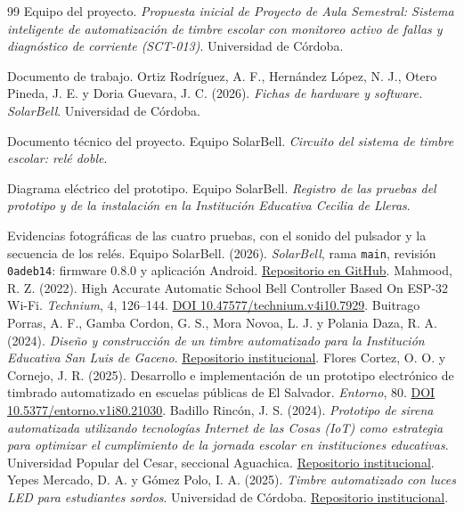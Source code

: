 \documentclass[a4paper,11pt]{article}
\newcommand{\senal}[1]{\texttt{#1}}
\newcommand{\bloquebiblio}[3]{\bibitem{#1} #2\par#3}
\begin{document}
\begin{thebibliography}{99}
\setlength{\itemsep}{3pt plus 0.5pt}
\bloquebiblio{propuesta}{Equipo del proyecto. \textit{Propuesta inicial de Proyecto de Aula Semestral: Sistema inteligente de automatización de timbre escolar con monitoreo activo de fallas y diagnóstico de corriente (SCT-013)}. Universidad de Córdoba.}{Documento de trabajo.}
\bloquebiblio{ficha}{Ortiz Rodríguez, A. F., Hernández López, N. J., Otero Pineda, J. E. y Doria Guevara, J. C. (2026). \textit{Fichas de hardware y software. SolarBell}. Universidad de Córdoba.}{Documento técnico del proyecto.}
\bloquebiblio{diagrama}{Equipo SolarBell. \textit{Circuito del sistema de timbre escolar: relé doble}.}{Diagrama eléctrico del prototipo.}
\bloquebiblio{evidencia}{Equipo SolarBell. \textit{Registro de las pruebas del prototipo y de la instalación en la Institución Educativa Cecilia de Lleras}.}{Evidencias fotográficas de las cuatro pruebas, con el sonido del pulsador y la secuencia de los relés.}
 Equipo SolarBell. (2026). \textit{SolarBell}, rama \senal{main}, revisión \senal{0adeb14}: firmware 0.8.0 y aplicación Android. \href{https://github.com/AndresOrtizJDK/SolarBell/tree/0adeb14514f4e0b15457052f21800002322fbb43}{Repositorio en GitHub}.
 Mahmood, R. Z. (2022). High Accurate Automatic School Bell Controller Based On ESP-32 Wi-Fi. \textit{Technium}, 4, 126--144. \href{https://doi.org/10.47577/technium.v4i10.7929}{DOI 10.47577/technium.v4i10.7929}.
 Buitrago Porras, A. F., Gamba Cordon, G. S., Mora Novoa, L. J. y Polania Daza, R. A. (2024). \textit{Diseño y construcción de un timbre automatizado para la Institución Educativa San Luis de Gaceno}. \href{https://repositorio.colegiosanluisgaceno.edu.co/proyecto-implementacion-de-una-pagina-web-corporativa-graficas-san-vicente/}{Repositorio institucional}.
 Flores Cortez, O. O. y Cornejo, J. R. (2025). Desarrollo e implementación de un prototipo electrónico de timbrado automatizado en escuelas públicas de El Salvador. \textit{Entorno}, 80. \href{https://doi.org/10.5377/entorno.v1i80.21030}{DOI 10.5377/entorno.v1i80.21030}.
 Badillo Rincón, J. S. (2024). \textit{Prototipo de sirena automatizada utilizando tecnologías Internet de las Cosas (IoT) como estrategia para optimizar el cumplimiento de la jornada escolar en instituciones educativas}. Universidad Popular del Cesar, seccional Aguachica. \href{http://repositorio.unicesar.edu.co/items/8a9ad412-bb9a-4cf4-b1f6-d2a827a3a118}{Repositorio institucional}.
 Yepes Mercado, D. A. y Gómez Polo, I. A. (2025). \textit{Timbre automatizado con luces LED para estudiantes sordos}. Universidad de Córdoba. \href{https://repositorio.unicordoba.edu.co/handle/ucordoba/9186}{Repositorio institucional}.
\end{thebibliography}
\endgroup
\end{document}

